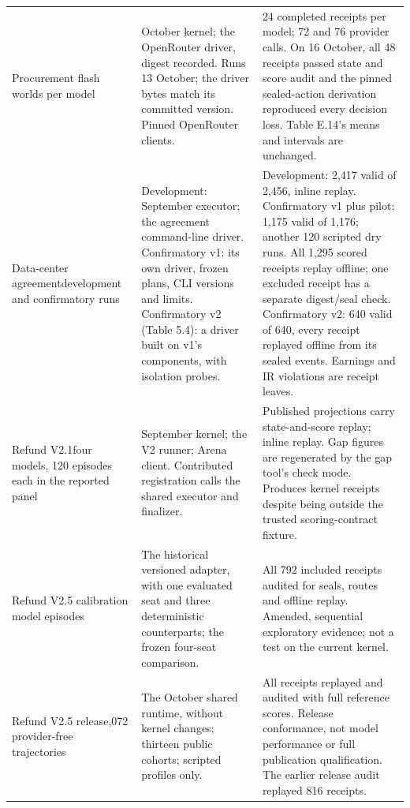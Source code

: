 \begin{longtable}{@{}P{1.28in}P{2.18in}P{3.06in}@{}}
\addlinespace[4pt]
Procurement flash worlds per model
& October kernel; the OpenRouter driver, digest recorded. Runs 13 October; the driver bytes match its committed version. Pinned OpenRouter clients.
& 24 completed receipts per model; 72 and 76 provider calls. On 16 October, all 48 receipts passed state and score audit and the pinned sealed-action derivation reproduced every decision loss. Table E.14's means and intervals are unchanged.\\
\addlinespace[4pt]
Data-center agreement\newline development and confirmatory runs
& Development: September executor; the agreement command-line driver. Confirmatory v1: its own driver, frozen plans, CLI versions and limits. Confirmatory v2 (Table 5.4): a driver built on v1's components, with isolation probes.
& Development: 2,417 valid of 2,456, inline replay. Confirmatory v1 plus pilot: 1,175 valid of 1,176; another 120 scripted dry runs. All 1,295 scored receipts replay offline; one excluded receipt has a separate digest/seal check. Confirmatory v2: 640 valid of 640, every receipt replayed offline from its sealed events. Earnings and IR violations are receipt leaves.\\
\addlinespace[4pt]
Refund V2.1\newline four models, 120 episodes each in the reported panel
& September kernel; the V2 runner; Arena client. Contributed registration calls the shared executor and finalizer.
& Published projections carry state-and-score replay; inline replay. Gap figures are regenerated by the gap tool's check mode. Produces kernel receipts despite being outside the trusted scoring-contract fixture.\\
\addlinespace[4pt]
Refund V2.5 calibration model episodes
& The historical versioned adapter, with one evaluated seat and three deterministic counterparts; the frozen four-seat comparison.
& All 792 included receipts audited for seals, routes and offline replay. Amended, sequential exploratory evidence; not a test on the current kernel.\\
\addlinespace[4pt]
Refund V2.5 release,072 provider-free trajectories
& The October shared runtime, without kernel changes; thirteen public cohorts; scripted profiles only.
& All receipts replayed and audited with full reference scores. Release conformance, not model performance or full publication qualification. The earlier release audit replayed 816 receipts.\\
\end{longtable}
\endgroup
